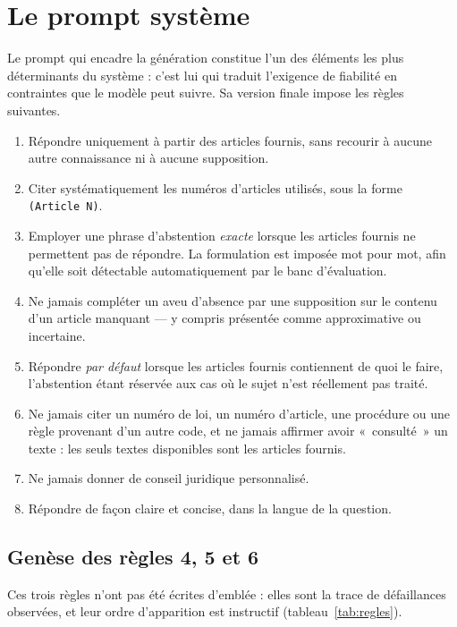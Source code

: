 \chapter{Le prompt système}
\label{ann:prompt}

Le prompt qui encadre la génération constitue l'un des éléments les plus déterminants du système :
c'est lui qui traduit l'exigence de fiabilité en contraintes que le modèle peut suivre. Sa version
finale impose les règles suivantes.

\begin{enumerate}
  \item Répondre uniquement à partir des articles fournis, sans recourir à aucune autre
        connaissance ni à aucune supposition.
  \item Citer systématiquement les numéros d'articles utilisés, sous la forme
        \texttt{(Article~N)}.
  \item Employer une phrase d'abstention \emph{exacte} lorsque les articles fournis ne permettent
        pas de répondre. La formulation est imposée mot pour mot, afin qu'elle soit détectable
        automatiquement par le banc d'évaluation.
  \item Ne jamais compléter un aveu d'absence par une supposition sur le contenu d'un article
        manquant --- y compris présentée comme approximative ou incertaine.
  \item Répondre \emph{par défaut} lorsque les articles fournis contiennent de quoi le faire,
        l'abstention étant réservée aux cas où le sujet n'est réellement pas traité.
  \item Ne jamais citer un numéro de loi, un numéro d'article, une procédure ou une règle
        provenant d'un autre code, et ne jamais affirmer avoir «~consulté~» un texte : les seuls
        textes disponibles sont les articles fournis.
  \item Ne jamais donner de conseil juridique personnalisé.
  \item Répondre de façon claire et concise, dans la langue de la question.
\end{enumerate}

\section{Genèse des règles 4, 5 et 6}

Ces trois règles n'ont pas été écrites d'emblée : elles sont la trace de défaillances observées, et
leur ordre d'apparition est instructif (tableau~\ref{tab:regles}).

